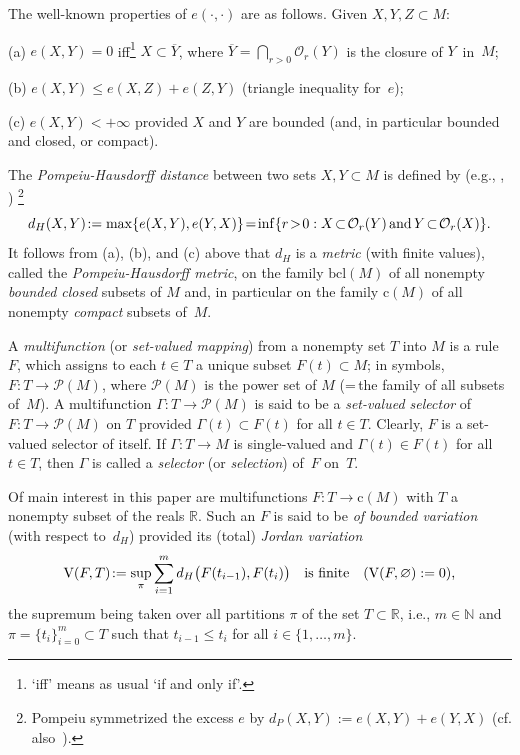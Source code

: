 \documentclass[preprint,12pt]{elsarticle}
\newcommand{\Rb}{\mathbb{R}}  \newcommand{\Nb}{\mathbb{N}}
\newcommand{\Oc}{\mathcal{O}}
\newcommand{\es}{\varnothing}
\newcommand{\nV}{\mbox{\rm V}}
\newcommand{\ov}[1]{\overline{#1}}
\begin{document}
The well-known properties of $e(\cdot,\cdot)$ are as follows. Given $X,Y,Z\subset M$:
\par\vspace{2pt}
(a) $e(X,Y)\!=\!0$ iff\footnote{`iff' means as usual `if and only if'.} $X\!\subset\!\ov{Y}$,
where $\ov{Y}\!=\!\bigcap_{r>0}\Oc_r(Y)$ is the closure of $Y$~in~$M$;
\par\vspace{2pt}
(b) $e(X,Y)\le e(X,Z)+e(Z,Y)$ (triangle inequality for~$e$);
\par\vspace{2pt}
(c) $e(X,Y)<+\infty$ provided $X$ and $Y$ are bounded (and, in particular bounded
and closed, or compact).

The \emph{Pompeiu-Hausdorff distance\/} between two sets $X,Y\subset M$
 is defined by (e.g., \cite{Pomp}, \cite[Chapter~II]{CV})%
\footnote{Pompeiu \cite{Pomp} symmetrized the excess $e$ by
 $d_P(X,Y)\!:=\!e(X,Y)\!+\!e(Y,X)$ (cf. also~\cite{Ber-Pac}).}
  \begin{equation*}
d_H(X,Y)\!:=\max\{e(X,Y),e(Y,X)\}\!=\!
\inf\{r\!>\!0:\mbox{$X\!\subset\!\Oc_r(Y)$\,and\,$Y\!\subset\!\Oc_r(X)$}\}.
  \end{equation*}
It follows from (a), (b), and (c) above that $d_H$ is a \emph{metric\/}
(with finite values), called the \emph{Pompeiu-Hausdorff metric}, on the family
$\mbox{bcl}(M)$ of all nonempty \emph{bounded closed\/} subsets of $M$ and, in 
particular on the family $\mbox{c}(M)$ of all nonempty \emph{compact\/} subsets of~$M$.

A \emph{multifunction\/} (or \emph{set-valued mapping\/}) from a nonempty set $T$
into $M$ is a rule $F$, which assigns to each $t\in T$ a unique subset $F(t)\subset M$;
in symbols, $F:T\to\mathcal{P}(M)$, where $\mathcal{P}(M)$ is the power set of $M$
(=\,the family of all subsets of~$M$). A multifunction $\Gamma:T\to\mathcal{P}(M)$
is said to be a \emph{set-valued selector\/} of $F:T\to\mathcal{P}(M)$ on $T$ provided
$\Gamma(t)\subset F(t)$ for all $t\in T$. Clearly, $F$ is a set-valued selector of itself.
If $\Gamma:T\to M$ is single-valued and $\Gamma(t)\in F(t)$ for all $t\in T$, then
$\Gamma$ is called a \emph{selector\/} (or \emph{selection\/}) of~$F$ on~$T$.

Of main interest in this paper are multifunctions $F:T\to\mbox{c}(M)$
with $T$ a nonempty subset of the reals $\Rb$. Such an $F$ is said to be
\emph{of bounded variation\/} (with respect to~$d_H$) provided its (total)
 \emph{Jordan variation\/}
  \begin{equation*}
\nV(F,T)\!:=\sup_\pi\sum_{i=1}^m d_H\bigl(F(t_{i-1}),F(t_i)\bigr)\quad
\mbox{is finite\quad ($\nV(F,\es):=0$),}
  \end{equation*}
the supremum being taken over all partitions $\pi$ of the set $T\subset\Rb$, i.e.,
$m\in\Nb$ and $\pi=\{t_i\}_{i=0}^m\subset T$ such that $t_{i-1}\le t_i$
for all $i\in\{1,\dots,m\}$.
\end{document}
